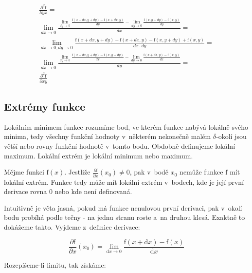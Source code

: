 \begin{equation}
\begin{split}
\frac{\partial^2 \mathrm{f}}{\partial yx} = \\
\lim_{dx \to 0} \frac{\lim_{dy \to 0} \frac{\mathrm{f}(x+dx, y+dy) - \mathrm{f}(x+dx, y)}{dy} - \lim_{dy \to 0} \frac{\mathrm{f}(x, y+dy) - \mathrm{f}(x, y)}{dy}}{dx} = \\
\lim_{dx \to 0, dy \to 0} \frac{\mathrm{f}(x+dx, y+dy) - \mathrm{f}(x+dx, y) - \mathrm{f}(x, y+dy) + \mathrm{f}(x, y)}{dx \cdot dy} = \\
\lim_{dx \to 0} \frac{\lim_{dy \to 0} \frac{\mathrm{f}(x+dx, y+dy) - \mathrm{f}(x, y+dy)}{dx} - \lim_{dy \to 0} \frac{\mathrm{f}(x+dx, y) - \mathrm{f}(x, y)}{dx}}{dy} = \\
\frac{\partial^2 \mathrm{f}}{\partial xy}
\end{split}
\end{equation}

\subsection{Extrémy funkce}

Lokálním minimem funkce rozumíme bod, ve kterém funkce nabývá lokálně svého minima, tedy všechny funkční hodnoty v~některém nekonečně malém \(\delta\)-okolí jsou větší nebo rovny funkční hodnotě v~tomto bodu. Obdobně definujeme lokální maximum. Lokální extrém je lokální minimum nebo maximum.

\begin{fact}
Mějme funkci \(\mathrm{f}(x)\). Jestliže \(\frac{\partial \mathrm{f}}{\partial x}(x_0) \neq 0\), pak v~bodě \(x_0\) nemůže funkce \(\mathrm{f}\) mít lokální extrém.
Funkce tedy může mít lokální extrém v~bodech, kde je její první derivace rovna 0 nebo kde není definovaná. 
\end{fact}

Intuitivně je věta jasná, pokud má funkce nenulovou první derivaci, pak v~okolí bodu probíhá podle tečny - na jednu stranu roste a~na druhou klesá. Exaktně to dokážeme takto. Vyjdeme z~definice derivace:

\begin{equation}
\frac{\partial \mathrm{f}}{\partial x}(x_0) = \lim_{\mathrm{d}x \to 0} \frac{\mathrm{f}(x + \mathrm{d}x) - \mathrm{f}(x)}{\mathrm{d}x}
\end{equation}

Rozepíšeme-li limitu, tak získáme:

